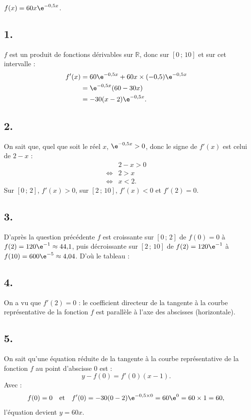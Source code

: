 \(f(x) = 60x \e^{-0{,}5x}\).

\subsection*{1.}

\( f \) est un produit de fonctions dérivables sur \( \mathbb{R} \), donc sur \([0 \,;\, 10]\) et sur cet intervalle :
\begin{align*}
f'(x) &= 60\e^{-0{,}5x} + 60x \times (-0{,}5)\e^{-0{,}5x} \\
&= \e^{-0{,}5x}(60 - 30x) \\
&= -30(x - 2)\e^{-0{,}5x}.
\end{align*}

\subsection*{2.}

On sait que, quel que soit le réel \( x \), \( \e^{-0{,}5x} > 0 \), donc le signe de \( f'(x) \) est celui de \( 2 - x \) :
\begin{align*}
&2 - x > 0 \\
\iff &2 > x \\
\iff &x < 2.
\end{align*}
Sur \([0 \,;\, 2]\), \( f'(x) > 0 \), sur \([2 \,;\, 10]\), \( f'(x) < 0 \) et \( f'(2) = 0 \).

\subsection*{3.}

D'après la question précédente \( f \) est croissante sur \([0 \,;\, 2]\) de \( f(0) = 0 \) à \( f(2) = 120\e^{-1} \approx 44{,}1 \), puis décroissante sur \([2 \,;\, 10]\) de \( f(2) = 120\e^{-1} \) à \( f(10) = 600\e^{-5} \approx 4{,}04 \). D'où le tableau :

\begin{center}
\end{center}

\subsection*{4.}
On a vu que \( f'(2) = 0 \) : le coefficient directeur de la tangente à la courbe représentative de la fonction \( f \) est parallèle à l'axe des abscisses (horizontale).

\subsection*{5.}

On sait qu'une équation réduite de la tangente à la courbe représentative de la fonction \( f \) au point d'abscisse 0 est :
\[
y - f(0) = f'(0)(x - 1).
\]
Avec :
\[
f(0) = 0 \quad \text{et} \quad f'(0) = -30(0 - 2)\e^{-0{,}5 \times 0} = 60 \e^0 = 60 \times 1 = 60,
\]
l'équation devient \(y = 60x\).
